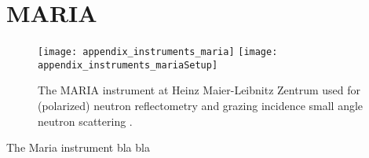 \documentclass[\main/dresen_thesis.tex]{subfiles}
\begin{document}
  \section{MARIA}\label{ch:lss:maria}
    \begin{figure}[ht]
      \centering
      \texttt{[image: appendix\_instruments\_maria]}
      \texttt{[image: appendix\_instruments\_mariaSetup]}
      \caption{\label{fig:lss:maria}The MARIA instrument at Heinz Maier-Leibnitz Zentrum used for (polarized) neutron reflectometry and grazing incidence small angle neutron scattering \cite{Heinz_2015_Maria}.}
    \end{figure}

    The Maria instrument bla bla
\end{document}
